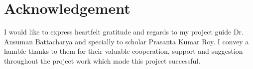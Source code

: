 \chapter*{\centering Acknowledgement}

{I would like to express heartfelt gratitude and regards to my project guide Dr. Ansuman Battacharya and specially to scholar Prasanta Kumar Roy. I convey a humble thanks to them for their valuable cooperation, support and suggestion throughout the project work which made this project successful.}